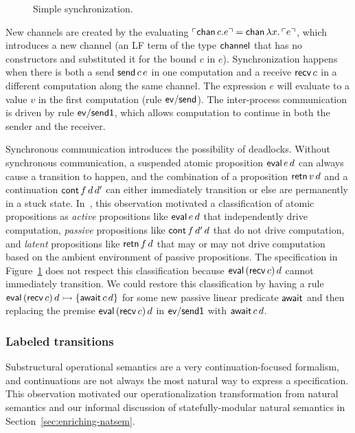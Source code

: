 \begin{figure}
\caption{Simple synchronization.}
\label{fig:dest-synch}
\end{figure}

New channels are created by the evaluating ${\ulcorner{{\sf chan}\,c.e}\urcorner} =
{\sf chan}\,\lambda x.\,{\ulcorner{e}\urcorner}$, which introduces a new channel
(an LF term of the type ${\sf channel}$ that has no constructors and
substituted it for the bound $c$ in $e$). Synchronization happens when
there is both a send ${\sf send}\,c\,e$ in one computation and a
receive ${\sf recv}\,c$ in a different computation along the same
channel. The expression $e$ will evaluate to a value $v$ in the first
computation (rule ${\sf ev/send}$). The inter-process communication is
driven by rule ${\sf ev/send1}$, which allows computation to continue
in both the sender and the receiver.

Synchronous communication introduces the possibility of
deadlocks. Without synchronous communication, a suspended atomic
proposition ${\sf eval}\,e\,d$ can always cause a transition to
happen, and the combination of a proposition ${\sf retn}\,v\,d$ and a
continuation ${\sf cont}\,f\,d\,d'$ can either immediately transition
or else are permanently in a stuck
state. In~\cite{pfenning09substructural}, this observation motivated a
classification of atomic propositions as {\it active} propositions
like ${\sf eval}\,e\,d$ that independently drive computation, {\it
  passive} propositions like ${\sf cont}\,f\,d'\,d$ that do not drive
computation, and {\it latent} propositions like ${\sf retn}\,f\,d$
that may or may not drive computation based on the ambient environment
of passive propositions. The specification in
Figure~\ref{fig:dest-synch} does not respect this classification
because ${\sf eval}\,({\sf recv}\,c)\,d$ cannot immediately
transition. We could restore this classification by having a rule
${\sf eval}\,({\sf recv}\,c)\,d \rightarrowtail \{ {\sf await}\,c\,d \}$ for
some new passive linear predicate ${\sf await}$ and then replacing the
premise ${\sf eval}\,({\sf recv}\,c)\,d$ in ${\sf ev/send1}$ with
${\sf await}\,c\,d$.

\subsubsection{Labeled transitions}

Substructural operational semantics are a very continuation-focused
formalism, and continuations are not always the most natural way to
express a specification. This observation motivated our
operationalization transformation from natural semantics and our
informal discussion of statefully-modular natural semantics in
Section~\ref{sec:enriching-natsem}. 


